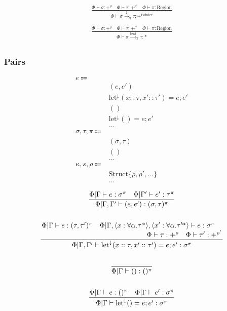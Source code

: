 \documentclass {article}
\begin{document}
\begin{gather*}
\frac
{\Phi \vdash \sigma : +^{\rho} \quad \Phi \vdash \tau : +^{\rho'} \quad \Phi \vdash \pi : \text{Region}}
{\Phi \vdash \sigma \xrightarrow{\downarrow}_\pi \tau : +^{\text{Pointer}}} \\
\\
\frac
{\Phi \vdash \sigma : +^{\rho} \quad \Phi \vdash \tau : +^{\rho'} \quad \Phi \vdash \pi : \text{Region}}
{\Phi \vdash \sigma \xrightarrow{\text{text}}_\pi \tau : *} \\
\end{gather*}

\subsubsection{Pairs}
\begin{align*}
e \Coloneqq & \\
& (e, e') \tag{Pair Introduction} \\
& \text{let}^\downarrow (x :: \tau, x' :: \tau') = e; e' \tag{Pair Elimination} \\
& () \tag{Unit Introduction} \\
& \text{let}^\downarrow () = e; e' \tag{Unit Elimination} \\
& \dots \\
\sigma, \tau, \pi \Coloneqq & \\
& (\sigma, \tau) \tag{Pair} \\
& () \tag{Unit} \\
& \dots \\
\kappa, s, \rho \Coloneqq & \\
& \text{Struct} \{ \rho, \rho', \dots \} \tag{Struct Representation} \\
& \dots
\end{align*}

\begin{gather*}
\frac
{\Phi | \Gamma \vdash e : \sigma^\pi \quad \Phi | \Gamma' \vdash e' : \tau^\pi}
{\Phi | \Gamma, \Gamma' \vdash (e, e') : (\sigma, \tau)^\pi } \\
\\
\frac
{\splitfrac{\Phi | \Gamma \vdash e : (\tau, \tau')^\pi \quad \Phi | \Gamma , \langle x : \forall \alpha. \tau^\alpha \rangle, \langle x' : \forall \alpha. \tau'^\alpha \rangle \vdash e : \sigma^\pi}
{\Phi \vdash \tau : +^{\rho} \quad \Phi \vdash \tau' : +^{\rho'} }}
{\Phi | \Gamma, \Gamma' \vdash \text{let}^\downarrow (x :: \tau, x' :: \tau') = e; e' : \sigma^\pi} \\
\\
\frac
{}
{\Phi | \Gamma \vdash () : ()^\pi} \\
\\
\frac
{\Phi | \Gamma \vdash e : ()^\pi \quad \Phi | \Gamma \vdash e' : \sigma^\pi}
{\Phi | \Gamma \vdash \text{let}^\downarrow () = e; e' : \sigma^\pi}
\end{gather*}
\end{document}
